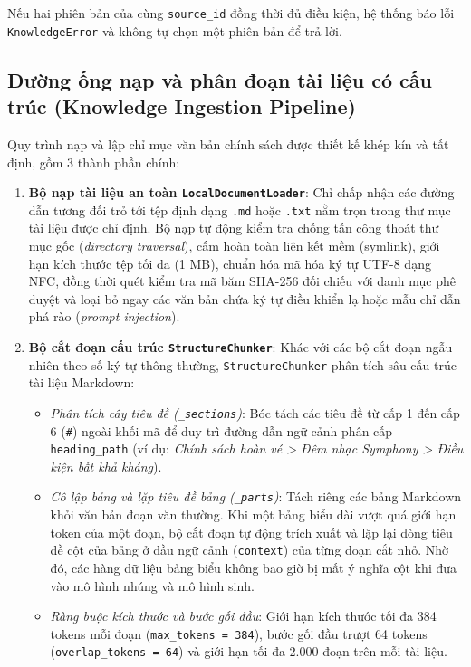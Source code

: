 Nếu hai phiên bản của cùng \texttt{source\_id} đồng thời đủ điều kiện, hệ thống báo lỗi \texttt{KnowledgeError} và không tự chọn một phiên bản để trả lời.

\subsection{Đường ống nạp và phân đoạn tài liệu có cấu trúc (Knowledge Ingestion Pipeline)}

Quy trình nạp và lập chỉ mục văn bản chính sách được thiết kế khép kín và tất định, gồm 3 thành phần chính:
\begin{enumerate}[nosep]
  \item \textbf{Bộ nạp tài liệu an toàn \texttt{LocalDocumentLoader}}: Chỉ chấp nhận các đường dẫn tương đối trỏ tới tệp định dạng \texttt{.md} hoặc \texttt{.txt} nằm trọn trong thư mục tài liệu được chỉ định. Bộ nạp tự động kiểm tra chống tấn công thoát thư mục gốc (\textit{directory traversal}), cấm hoàn toàn liên kết mềm (symlink), giới hạn kích thước tệp tối đa (1 MB), chuẩn hóa mã hóa ký tự UTF-8 dạng NFC, đồng thời quét kiểm tra mã băm SHA-256 đối chiếu với danh mục phê duyệt và loại bỏ ngay các văn bản chứa ký tự điều khiển lạ hoặc mẫu chỉ dẫn phá rào (\textit{prompt injection}).
  \item \textbf{Bộ cắt đoạn cấu trúc \texttt{StructureChunker}}: Khác với các bộ cắt đoạn ngẫu nhiên theo số ký tự thông thường, \texttt{StructureChunker} phân tích sâu cấu trúc tài liệu Markdown:
  \begin{itemize}[nosep]
    \item \textit{Phân tích cây tiêu đề (\texttt{\_sections})}: Bóc tách các tiêu đề từ cấp 1 đến cấp 6 (\texttt{\#}) ngoài khối mã để duy trì đường dẫn ngữ cảnh phân cấp \texttt{heading\_path} (ví dụ: \textit{Chính sách hoàn vé > Đêm nhạc Symphony > Điều kiện bất khả kháng}).
    \item \textit{Cô lập bảng và lặp tiêu đề bảng (\texttt{\_parts})}: Tách riêng các bảng Markdown khỏi văn bản đoạn văn thường. Khi một bảng biểu dài vượt quá giới hạn token của một đoạn, bộ cắt đoạn tự động trích xuất và lặp lại dòng tiêu đề cột của bảng ở đầu ngữ cảnh (\texttt{context}) của từng đoạn cắt nhỏ. Nhờ đó, các hàng dữ liệu bảng biểu không bao giờ bị mất ý nghĩa cột khi đưa vào mô hình nhúng và mô hình sinh.
    \item \textit{Ràng buộc kích thước và bước gối đầu}: Giới hạn kích thước tối đa 384 tokens mỗi đoạn (\texttt{max\_tokens = 384}), bước gối đầu trượt 64 tokens (\texttt{overlap\_tokens = 64}) và giới hạn tối đa 2.000 đoạn trên mỗi tài liệu.

\end{itemize}
\end{enumerate}
